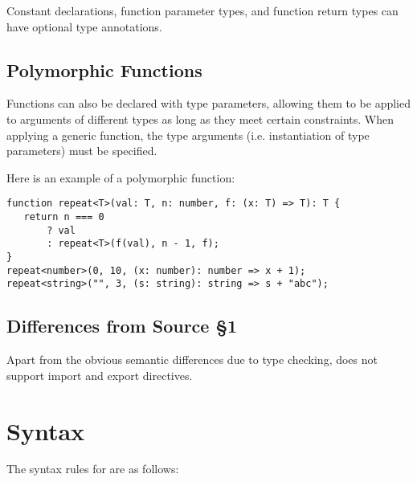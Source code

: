 Constant declarations, function parameter types, and function return types can have optional type annotations. 

\subsection{Polymorphic Functions}

Functions can also be declared with type parameters, allowing them to be applied to arguments of different types as long as they meet certain constraints.
When applying a generic function, the type arguments (i.e. instantiation of type parameters) must be specified.

Here is an example of a polymorphic function:
\begin{verbatim}
function repeat<T>(val: T, n: number, f: (x: T) => T): T {
   return n === 0
       ? val
       : repeat<T>(f(val), n - 1, f);
}
repeat<number>(0, 10, (x: number): number => x + 1);
repeat<string>("", 3, (s: string): string => s + "abc");
\end{verbatim}

\subsection{Differences from Source \S 1}

Apart from the obvious semantic differences due to type checking, \DynamicTS{} does not support import and export directives.


\section{Syntax}

The syntax rules for \DynamicTS{} are as follows:

